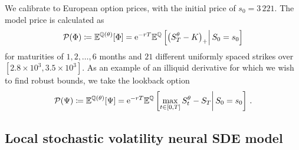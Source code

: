 We calibrate to European option prices, with the initial price of $s_0=3\,221$. The model price is calculated as
\[
\mathcal{P}(\Phi) \coloneqq  \mathbb{E}^{\mathbb{Q}(\theta)}[\Phi] = \mathrm{e}^{-rT} \mathbb{E}^{\mathbb{Q}} \left[\left(S_T^\theta - K \right)_+ \middle| \, S_0 = s_0\right]
\]
for maturities of $1,2,\ldots,6$ months and $21$ different uniformly spaced strikes over ${[2.8\times 10^3, 3.5 \times 10^3]}$. 
As an example of an illiquid derivative for which we wish to find robust bounds, we take the lookback option
\[
\mathcal{P}(\Psi) \coloneqq  \mathbb{E}^{\mathbb{Q}(\theta)}[\Psi] = \mathrm{e}^{-rT} \mathbb{E}^{\mathbb{Q}} \left[\max_{t\in[0,T]}S_t^\theta - S_T \middle| \, S_0 = s_0 \right]\, .
\]

%
%
%

\subsection{Local stochastic volatility neural SDE model} \label{sec LSV}

